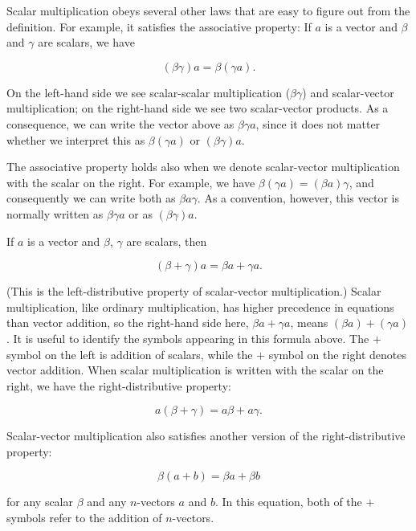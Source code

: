 Scalar multiplication obeys several other laws that are easy to figure out from the definition. For example, it satisfies the associative property: If \(a\) is a vector and \(\beta\) and \(\gamma\) are scalars, we have

\[(\beta\gamma)a=\beta(\gamma a).\]

On the left-hand side we see scalar-scalar multiplication (\(\beta\gamma\)) and scalar-vector multiplication; on the right-hand side we see two scalar-vector products. As a consequence, we can write the vector above as \(\beta\gamma a\), since it does not matter whether we interpret this as \(\beta(\gamma a)\) or \((\beta\gamma)a\).

The associative property holds also when we denote scalar-vector multiplication with the scalar on the right. For example, we have \(\beta(\gamma a)=(\beta a)\gamma\), and consequently we can write both as \(\beta a\gamma\). As a convention, however, this vector is normally written as \(\beta\gamma a\) or as \((\beta\gamma)a\).

If \(a\) is a vector and \(\beta\), \(\gamma\) are scalars, then

\[(\beta+\gamma)a=\beta a+\gamma a.\]

(This is the left-distributive property of scalar-vector multiplication.) Scalar multiplication, like ordinary multiplication, has higher precedence in equations than vector addition, so the right-hand side here, \(\beta a+\gamma a\), means \((\beta a)+(\gamma a)\). It is useful to identify the symbols appearing in this formula above. The \(+\) symbol on the left is addition of scalars, while the \(+\) symbol on the right denotes vector addition. When scalar multiplication is written with the scalar on the right, we have the right-distributive property:

\[a(\beta+\gamma)=a\beta+a\gamma.\]

Scalar-vector multiplication also satisfies another version of the right-distributive property:

\[\beta(a+b)=\beta a+\beta b\]

for any scalar \(\beta\) and any \(n\)-vectors \(a\) and \(b\). In this equation, both of the \(+\) symbols refer to the addition of \(n\)-vectors.

